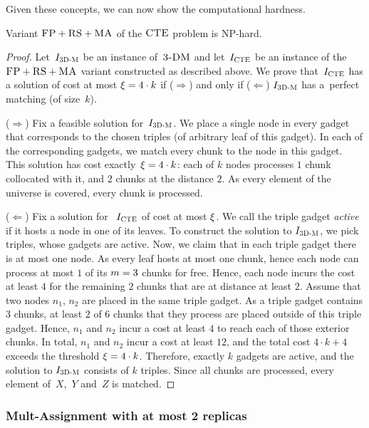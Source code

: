 Given these concepts, we can now show the computational hardness.
\begin{theorem}
  Variant $\textsc{FP}+\textsc{RS}+\textsc{MA}$ of the $\textsc{CTE}$ problem is NP-hard.
  \label{th:ma-unlimited}
\end{theorem}
\begin{proof}
Let~$I_{\mathrm{\textsc{3D-M}}}$ be an instance of~$\textsc{3-DM}$ and let~$I_{\mathrm{\textsc{CTE}}}$ be an instance of
the~$\textsc{FP}+\textsc{RS}+\textsc{MA}$ variant constructed as described above. We prove that~$I_{\mathrm{\textsc{CTE}}}$ has a solution of cost at most $\xi = 4 \cdot k$ if ($\Rightarrow$) and only if
($\Leftarrow$)
$I_{\mathrm{\textsc{3D-M}}}$ has a~perfect matching (of size~$k$).

($\Rightarrow$) Fix a feasible solution for~$I_{\mathrm{\textsc{3D-M}}}$. We place a single node in every
gadget that corresponds to the chosen triples (of arbitrary leaf of this gadget). In each of the corresponding
gadgets, we match every chunk to the node in this gadget. This
solution has
cost exactly~$\xi = 4\cdot k$: each of $k$ nodes processes $1$ chunk collocated with it, and $2$ chunks at the distance $2$. As every element of the universe is covered, every
chunk is processed.

($\Leftarrow$) Fix a solution for ~$I_{\mathrm{\textsc{CTE}}}$ of cost at most $\xi$.
We call the triple gadget \emph{active} if it hosts a node in one of its leaves.
To construct the solution to $I_{\mathrm{\textsc{3D-M}}}$, we pick triples, whose gadgets are active.
Now, we claim that in each triple gadget there is at most one node.
As every leaf hosts at most one chunk, hence each node can process at most $1$ of its $m=3$ chunks for free.
Hence, each node incurs the cost at least $4$ for the remaining $2$ chunks that are at distance at least $2$.
Assume that two nodes $n_1$, $n_2$ are placed in the same triple gadget.
As a triple gadget contains $3$ chunks, at least $2$ of $6$ chunks that they process are placed outside of this triple gadget.
Hence, $n_1$ and $n_2$ incur a cost at least $4$ to reach each of those exterior chunks.
In total, $n_1$ and $n_2$ incur a cost at least $12$, and the total cost $4\cdot k + 4$ exceeds the threshold $\xi = 4\cdot k$.
Therefore, exactly $k$ gadgets are active, and the solution to $I_{\mathrm{\textsc{3D-M}}}$ consists of $k$ triples.
Since all chunks are processed, every element of~$X$,~$Y$ and~$Z$ is matched.
\end{proof}

\subsubsection{Mult-Assignment with at most 2 replicas}

